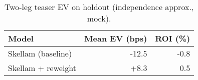 \begin{table}[t]
  \centering
  \small
  \caption{Two-leg teaser EV on holdout (independence approx., mock).}
  \begin{tabular}{lrr}
    \toprule
    Model & Mean EV (bps) & ROI (\%) \\
    \midrule
    Skellam (baseline) & -12.5 & -0.8 \\
    Skellam + reweight & +8.3  & 0.5 \\
    \bottomrule
  \end{tabular}
\end{table}
